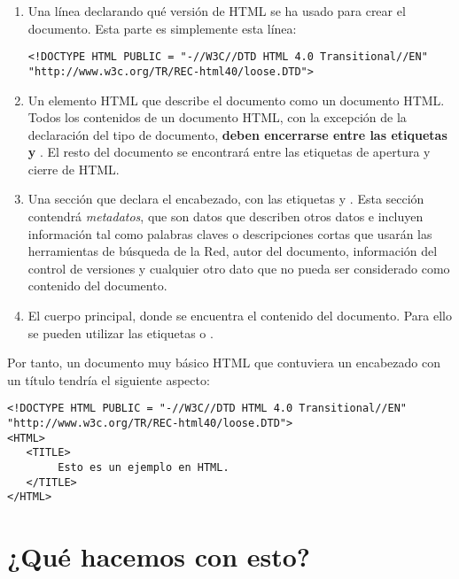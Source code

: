 \begin{enumerate}

\item Una línea declarando qué versión  de HTML se ha usado para crear
el documento.  Esta parte  es simplemente esta  línea:

\begin{verbatim}
<!DOCTYPE HTML PUBLIC = "-//W3C//DTD HTML 4.0 Transitional//EN"
"http://www.w3c.org/TR/REC-html40/loose.DTD"> 
\end{verbatim}

\item Un  elemento HTML  que describe el  documento como  un documento
HTML. Todos los  contenidos de un documento HTML, con  la excepción de
la declaración  del tipo de do\-cu\-men\-to,  \textbf{deben encerrarse
entre  las  etiquetas     y  }.  El  resto  del
documento se  encontrará entre las  etiquetas de apertura y  cierre de
HTML.

\item  Una  sección  que  declara el  encabezado,  con  las  etiquetas
 y . Esta sección contendrá \textit{metadatos},
que  son  datos  que  describen otros  datos  e  incluyen  información
tal  como  palabras  claves  o descripciones  cortas  que  usarán  las
herramientas de búsqueda  de la Red, autor  del documento, información
del  control de  versiones  y cualquier  otro dato  que  no pueda  ser
considerado como contenido del documento.

\item  El  cuerpo  principal,  donde se  encuentra  el  contenido  del
documento. Para  ello se pueden  utilizar las etiquetas   o
.

\end{enumerate}

Por tanto, un  documento muy básico HTML que  contuviera un encabezado
con un título tendría el siguiente aspecto:

\begin{verbatim}
<!DOCTYPE HTML PUBLIC = "-//W3C//DTD HTML 4.0 Transitional//EN"
"http://www.w3c.org/TR/REC-html40/loose.DTD">
<HTML>
   <TITLE>
        Esto es un ejemplo en HTML.
   </TITLE>
</HTML>
\end{verbatim}

\section{¿Qué hacemos con esto?}

